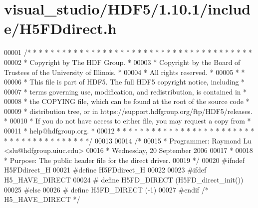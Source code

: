 \hypertarget{visual__studio_2_h_d_f5_21_810_81_2include_2_h5_f_ddirect_8h_source}{}\section{visual\+\_\+studio/\+H\+D\+F5/1.10.1/include/\+H5\+F\+Ddirect.h}
\label{visual__studio_2_h_d_f5_21_810_81_2include_2_h5_f_ddirect_8h_source}

\begin{DoxyCode}
00001 \textcolor{comment}{/* * * * * * * * * * * * * * * * * * * * * * * * * * * * * * * * * * * * * * *}
00002 \textcolor{comment}{ * Copyright by The HDF Group.                                               *}
00003 \textcolor{comment}{ * Copyright by the Board of Trustees of the University of Illinois.         *}
00004 \textcolor{comment}{ * All rights reserved.                                                      *}
00005 \textcolor{comment}{ *                                                                           *}
00006 \textcolor{comment}{ * This file is part of HDF5.  The full HDF5 copyright notice, including     *}
00007 \textcolor{comment}{ * terms governing use, modification, and redistribution, is contained in    *}
00008 \textcolor{comment}{ * the COPYING file, which can be found at the root of the source code       *}
00009 \textcolor{comment}{ * distribution tree, or in https://support.hdfgroup.org/ftp/HDF5/releases.  *}
00010 \textcolor{comment}{ * If you do not have access to either file, you may request a copy from     *}
00011 \textcolor{comment}{ * help@hdfgroup.org.                                                        *}
00012 \textcolor{comment}{ * * * * * * * * * * * * * * * * * * * * * * * * * * * * * * * * * * * * * * */}
00013 
00014 \textcolor{comment}{/*}
00015 \textcolor{comment}{ * Programmer:  Raymond Lu <slu@hdfgroup.uiuc.edu>}
00016 \textcolor{comment}{ *              Wednesday, 20 September 2006}
00017 \textcolor{comment}{ *}
00018 \textcolor{comment}{ * Purpose: The public header file for the direct driver.}
00019 \textcolor{comment}{ */}
00020 \textcolor{preprocessor}{#ifndef H5FDdirect\_H}
00021 \textcolor{preprocessor}{#define H5FDdirect\_H}
00022 
00023 \textcolor{preprocessor}{#ifdef H5\_HAVE\_DIRECT}
00024 \textcolor{preprocessor}{#       define H5FD\_DIRECT  (H5FD\_direct\_init())}
00025 \textcolor{preprocessor}{#else}
00026 \textcolor{preprocessor}{#       define H5FD\_DIRECT      (-1)}
00027 \textcolor{preprocessor}{#endif }\textcolor{comment}{/* H5\_HAVE\_DIRECT */}\textcolor{preprocessor}{}

\end{DoxyCode}
